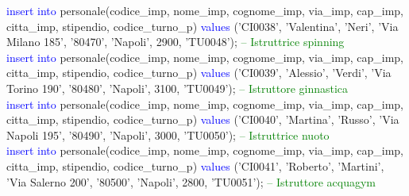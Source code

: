 \documentclass{article}
\begin{document}
\begin{flushleft}
{        \vspace{2mm}
        \hspace*{0.5em}\textcolor{blue}{insert into} personale(codice\_imp, nome\_imp, cognome\_imp, via\_imp, cap\_imp, \hspace*{0.5em}citta\_imp, stipendio, codice\_turno\_p) \textcolor{blue}{values} ('CI0038', 'Valentina', 'Neri', 'Via \hspace*{0.5em}Milano 185', \hspace*{0.5em}'80470', 'Napoli', 2900, 'TU0048'); \hspace*{0.5em} \textcolor{green}{-- Istruttrice spinning} \\
        \vspace{2mm}
        \hspace*{0.5em}\textcolor{blue}{insert into} personale(codice\_imp, nome\_imp, cognome\_imp, via\_imp, cap\_imp, \hspace*{0.5em}citta\_imp, stipendio, codice\_turno\_p) \textcolor{blue}{values} ('CI0039', 'Alessio', 'Verdi', 'Via \hspace*{0.5em}Torino 190', \hspace*{0.5em}'80480', 'Napoli', 3100, 'TU0049'); \hspace*{0.5em} \textcolor{green}{-- Istruttore ginnastica} \\
        \vspace{2mm}
        \hspace*{0.5em}\textcolor{blue}{insert into} personale(codice\_imp, nome\_imp, cognome\_imp, via\_imp, cap\_imp, \hspace*{0.5em}citta\_imp, stipendio, codice\_turno\_p) \textcolor{blue}{values} ('CI0040', 'Martina', 'Russo', 'Via \hspace*{0.5em}Napoli 195', \hspace*{0.5em}'80490', 'Napoli', 3000, 'TU0050'); \hspace*{0.5em} \textcolor{green}{-- Istruttrice nuoto} \\
        \vspace{2mm}
        \hspace*{0.5em}\textcolor{blue}{insert into} personale(codice\_imp, nome\_imp, cognome\_imp, via\_imp, cap\_imp, \hspace*{0.5em}citta\_imp, stipendio, codice\_turno\_p) \textcolor{blue}{values} ('CI0041', 'Roberto', 'Martini', \hspace*{0.5em}'Via Salerno 200', \hspace*{0.5em}'80500', 'Napoli', 2800, 'TU0051'); \hspace*{0.5em} \textcolor{green}{-- Istruttore acquagym} \\
}
\end{flushleft}
\end{document}
